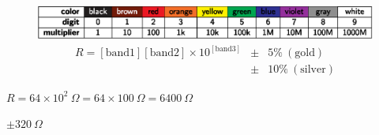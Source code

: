 \documentclass[11pt]{article}
\def\lthtmlcheckvsize{\ifdim\ht\sizebox<\vsize 
  \ifdim\wd\sizebox<\hsize\expandafter\hfill\fi \expandafter\vfill
  \else\expandafter\vss\fi}%
\begin{document}
{\newpage\clearpage
{}%
\begin{figure}  
  \begin{center}
    
  \end{center}
\end{figure}%
\lthtmlfigureZ
\lthtmlcheckvsize\clearpage}

{\newpage\clearpage
{}%
\begin{figure}  
  \begin{center}
\includegraphics{resistor_color_codes.eps}
    \begin{eqnarray*}
      R = [\mathrm{band 1}][\mathrm{band 2}] 
      \times 10^{[\mathrm{band 3}]} & \pm & 5\%~(\mathrm{gold})\\
      & \pm & 10\%~(\mathrm{silver})\nonumber
    \end{eqnarray*}
    
  \end{center}
\end{figure}%
\lthtmlfigureZ
\lthtmlcheckvsize\clearpage}

{\newpage\clearpage
{}%
$R = 64
\times 10^{2}~\Omega = 64 \times 100~\Omega = 6400~\Omega$%
\lthtmlindisplaymathZ
\lthtmlcheckvsize\clearpage}

{\newpage\clearpage
{}%
$\pm 320~\Omega$%
\lthtmlindisplaymathZ
\lthtmlcheckvsize\clearpage}
\end{document}
